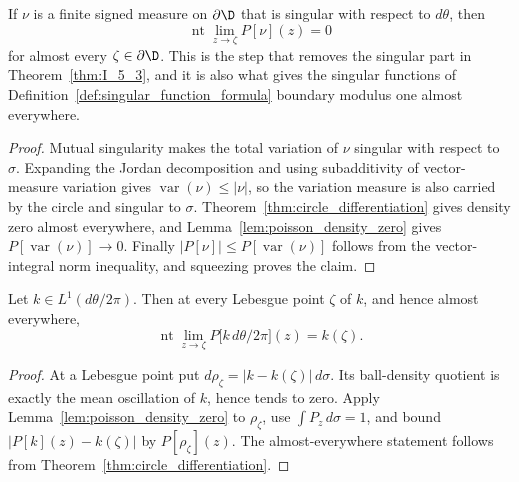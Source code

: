 \begin{lemma}
  \label{lem:I_5_4}
  \leanok
  \mainline
  If $\nu$ is a finite signed measure on $\partial\D$ that is singular with
  respect to $d\theta$, then
  \[
    \operatorname{nt}\lim_{z\to\zeta}P[\nu](z)=0
  \]
  for almost every $\zeta\in\partial\D$. This is the step that removes the
  singular part in Theorem~\ref{thm:I_5_3}, and it is also what gives the
  singular functions of Definition~\ref{def:singular_function_formula} boundary
  modulus one almost everywhere.
  \begin{proof}
    \leanok
    Mutual singularity makes the total variation of $\nu$ singular with
    respect to $\sigma$. Expanding the Jordan decomposition and using
    subadditivity of vector-measure variation gives
    $\operatorname{var}(\nu)\le |\nu|$, so the variation measure is also
    carried by the circle and singular to $\sigma$. Theorem~\ref{thm:circle_differentiation}
    gives density zero almost everywhere, and Lemma~\ref{lem:poisson_density_zero}
    gives $P[\operatorname{var}(\nu)]\to0$. Finally
    $|P[\nu]|\le P[\operatorname{var}(\nu)]$ follows from the vector-integral
    norm inequality, and squeezing proves the claim.
  \end{proof}
\end{lemma}

\begin{theorem}
  \label{thm:I_5_3_ac}
  \leanok
  Let $k\in L^1(d\theta/2\pi)$. Then at every Lebesgue point $\zeta$ of $k$,
  and hence almost everywhere,
  \[
    \operatorname{nt}\lim_{z\to\zeta}P\bigl[k\,d\theta/2\pi\bigr](z)=k(\zeta).
  \]
  \begin{proof}
    \leanok
    At a Lebesgue point put
    $d\rho_\zeta=|k-k(\zeta)|\,d\sigma$. Its ball-density quotient is exactly
    the mean oscillation of $k$, hence tends to zero. Apply
    Lemma~\ref{lem:poisson_density_zero} to $\rho_\zeta$, use
    $\int P_z\,d\sigma=1$, and bound
    $|P[k](z)-k(\zeta)|$ by $P[\rho_\zeta](z)$. The almost-everywhere statement
    follows from Theorem~\ref{thm:circle_differentiation}.
  \end{proof}
\end{theorem}

